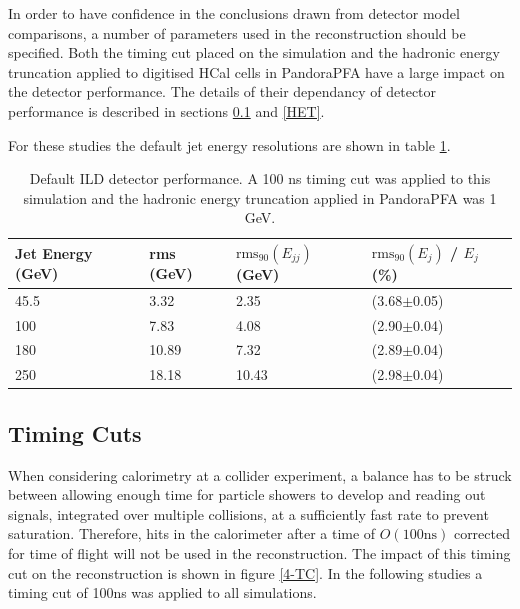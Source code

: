 \documentclass[final,3p,times,twocolumn]{elsarticle}
\begin{document}
In order to have confidence in the conclusions drawn from detector model comparisons, a number of parameters used in the reconstruction should be specified.  Both the timing cut placed on the simulation and the hadronic energy truncation applied to digitised HCal cells in PandoraPFA have a large impact on the detector performance.  The details of their dependancy of detector performance is described in sections \ref{TC} and \ref{HET}.

For these studies the default jet energy resolutions are shown in table \ref{Default}.

\begin{table}[h!]
\centering
\begin{tabular}{| p{1.5cm} | p{1cm} | p{1.5cm} | p{2.25cm} |} 
 \hline
 Jet Energy (GeV) & rms (GeV) & $\text{rms}_{90}(E_{jj})$ (GeV) & $\text{rms}_{90}(E_{j})$ / $E_{j}$ (\%)  \\ [0.5ex] 
 \hline
 45.5 & 3.32 & 2.35 & (3.68$\pm$0.05) \\ 
 100 & 7.83 & 4.08 & (2.90$\pm$0.04) \\
 180 & 10.89 & 7.32 & (2.89$\pm$0.04) \\
 250 & 18.18 & 10.43 & (2.98$\pm$0.04) \\
 \hline
\end{tabular}
\caption{Default ILD detector performance.  A 100 ns timing cut was applied to this simulation and the hadronic energy truncation applied in PandoraPFA was 1 GeV.}
\label{Default}
\end{table}

\subsection{Timing Cuts}
\label{TC}

When considering calorimetry at a collider experiment, a balance has to be struck between allowing enough time for particle showers to develop and reading out signals, integrated over multiple collisions, at a sufficiently fast rate to prevent saturation.  Therefore, hits in the calorimeter after a time of $O(100 \text{ns})$ corrected for time of flight will not be used in the reconstruction.  The impact of this timing cut on the reconstruction is shown in figure \ref{4-TC}.  In the following studies a timing cut of 100ns was applied to all simulations.  
\end{document}

